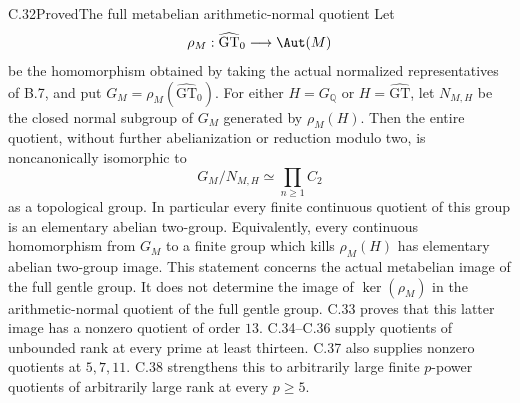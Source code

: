 \begin{statement}{C.32}{Proved}{The full metabelian arithmetic-normal quotient}
Let
\[
 \rho_M:\widehat{\mathrm{GT}}_0\longrightarrow\Aut(M)
\]
be the homomorphism obtained by taking the actual normalized
representatives of B.7, and put
$G_M=\rho_M(\widehat{\mathrm{GT}}_0)$.
For either $H=G_{\mathbb Q}$ or
$H=\widehat{\mathrm{GT}}$, let $N_{M,H}$ be the closed normal
subgroup of $G_M$ generated by $\rho_M(H)$.
Then the entire quotient, without further abelianization or
reduction modulo two, is noncanonically isomorphic to
\[
                G_M/N_{M,H}\simeq\prod_{n\geq1}C_2
                \tag{C.32.1}
\]
as a topological group.
In particular every finite continuous quotient of this group is
an elementary abelian two-group. Equivalently, every continuous
homomorphism from $G_M$ to a finite group which kills $\rho_M(H)$
has elementary abelian two-group image.
This statement concerns the actual metabelian image of the full
gentle group. It does not determine the image of $\ker(\rho_M)$ in the
arithmetic-normal quotient of the full gentle group.
C.33 proves that this latter image has a nonzero quotient of order
$13$.
C.34--C.36 supply quotients of unbounded rank at every prime
at least thirteen.
C.37 also supplies nonzero quotients at $5,7,11$.
C.38 strengthens this to arbitrarily large finite $p$-power
quotients of arbitrarily large rank at every $p\geq5$.
\end{statement}
